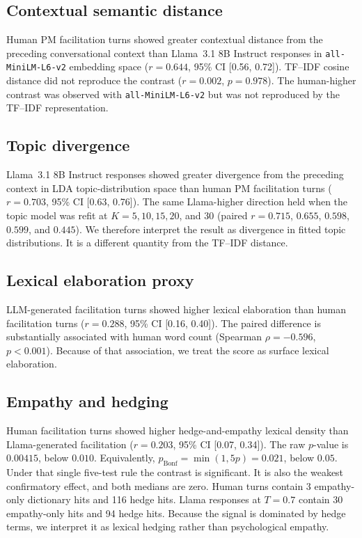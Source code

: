 \documentclass[11pt]{article}
\begin{document}
\subsection{Contextual semantic distance}
Human PM facilitation turns showed greater contextual distance from the preceding conversational context than Llama~3.1 8B Instruct responses in \texttt{all-MiniLM-L6-v2} embedding space ($r = 0.644$, 95\% CI [0.56, 0.72]). TF--IDF cosine distance did not reproduce the contrast ($r = 0.002$, $p = 0.978$). The human-higher contrast was observed with \texttt{all-MiniLM-L6-v2} but was not reproduced by the TF--IDF representation.

\subsection{Topic divergence}
Llama~3.1 8B Instruct responses showed greater divergence from the preceding context in LDA topic-distribution space than human PM facilitation turns ($r = 0.703$, 95\% CI [0.63, 0.76]). The same Llama-higher direction held when the topic model was refit at $K = 5, 10, 15, 20$, and $30$ (paired $r = 0.715$, $0.655$, $0.598$, $0.599$, and $0.445$). We therefore interpret the result as divergence in fitted topic distributions. It is a different quantity from the TF--IDF distance.

\subsection{Lexical elaboration proxy}
LLM-generated facilitation turns showed higher lexical elaboration than human facilitation turns ($r = 0.288$, 95\% CI [0.16, 0.40]). The paired difference is substantially associated with human word count (Spearman $\rho = -0.596$, $p < 0.001$). Because of that association, we treat the score as surface lexical elaboration.

\subsection{Empathy and hedging}
Human facilitation turns showed higher hedge-and-empathy lexical density than Llama-generated facilitation ($r = 0.203$, 95\% CI [0.07, 0.34]). The raw $p$-value is $0.00415$, below $0.010$. Equivalently, $p_\text{Bonf} = \min(1, 5p) = 0.021$, below $0.05$. Under that single five-test rule the contrast is significant. It is also the weakest confirmatory effect, and both medians are zero. Human turns contain 3 empathy-only dictionary hits and 116 hedge hits. Llama responses at $T = 0.7$ contain 30 empathy-only hits and 94 hedge hits. Because the signal is dominated by hedge terms, we interpret it as lexical hedging rather than psychological empathy.
\end{document}
